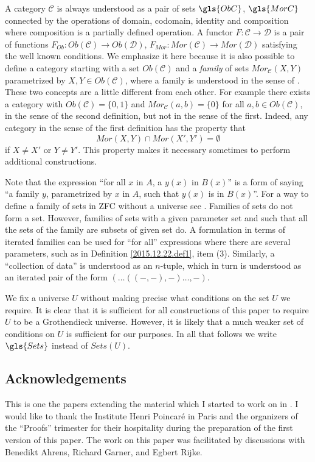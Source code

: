 \documentclass[onecolumn,12pt]{amsart}
\numberwithin{proposition}{subsection}
\newcommand{\sr}{\rightarrow}
\newcommand{\C}{{\mathcal C}}
\newcommand{\D}{{\mathcal D}}
\begin{document}
A category $\C$ is always understood as a pair of sets $\gls{ObC}$, $\gls{MorC}$
connected by the operations of domain, codomain, identity and composition where
composition is a partially defined operation. A functor $F:\C\sr \D$ is a pair
of functions $F_{Ob}:Ob(\C)\sr Ob(\D)$, $F_{Mor}:Mor(\C)\sr Mor(\D)$ satisfying
the well known conditions. We emphasize it here because it is also possible to
define a category starting with a set $Ob(\C)$ and a {\em family} of sets
$Mor_{\C}(X,Y)$ parametrized by $X,Y\in Ob(\C)$, where a {family} is understood
in the sense of \cite[Remark 3.9]{fromunivwithPiI}. These two concepts are a
little different from each other. For example there exists a category with
$Ob(\C)=\{0,1\}$ and $Mor_{\C}(a,b)=\{0\}$ for all $a,b\in Ob(\C)$, in the
sense of the second definition, but not in the sense of the first. Indeed, any
category in the sense of the first definition has the property that
%
$$Mor(X,Y)\cap Mor(X',Y')=\emptyset$$
%
if $X\ne X'$ or $Y\ne Y'$. This property makes it necessary sometimes to
perform additional constructions.

Note that the expression ``for all $x$ in $A$, a $y(x)$ in $B(x)$'' is a form
of saying ``a family $y$, parametrized by $x$ in $A$, such that $y(x)$ is in
$B(x)$''. For a way to define a family of sets in ZFC without a universe
see \cite[Remark 3.9]{fromunivwithPiI}. Families of sets do not form a
set. However, families of sets with a given parameter set and such that all the
sets of the family are subsets of given set do. A formulation in terms of
iterated families can be used for ``for all'' expressions where there are
several parameters, such as in Definition \ref{2015.12.22.def1}, item (3). Similarly, a
``collection of data'' is understood as an $n$-tuple, which in turn is understood as
an iterated pair of the form $(\dots((-,-),-)\dots,-)$.

We fix a universe $U$ without making precise what conditions on the set $U$ we
require. It is clear that it is sufficient for all constructions of this paper
to require $U$ to be a Grothendieck universe. However, it is likely that a much
weaker set of conditions on $U$ is sufficient for our purposes. In all that
follows we write $\gls{Sets}$ instead of $Sets(U)$.

\subsection{Acknowledgements}

This is one the papers extending the material which I started to work on in
\cite{NTS}. I would like to thank the Institute Henri Poincar\'e in Paris and the
organizers of the ``Proofs'' trimester for their hospitality during the
preparation of the first version of this paper. The work on this paper was
facilitated by discussions with Benedikt Ahrens, Richard Garner, and Egbert
Rijke.
\end{document}
